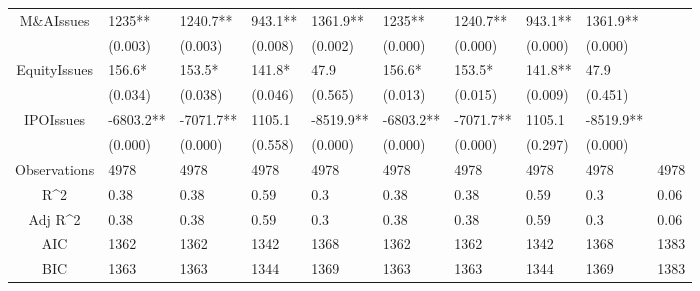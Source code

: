 \documentclass{article}
\begin{document}
\begin{table}[H]
\begin{tabular}{|clllllllll|}
  M\&AIssues & 1235** & 1240.7** & 943.1** & 1361.9** & 1235** & 1240.7** & 943.1** & 1361.9** &  \\ 
   & (0.003) & (0.003) & (0.008) & (0.002) & (0.000) & (0.000) & (0.000) & (0.000) &  \\ 
  EquityIssues & 156.6* & 153.5* & 141.8* & 47.9 & 156.6* & 153.5* & 141.8** & 47.9 &  \\ 
   & (0.034) & (0.038) & (0.046) & (0.565) & (0.013) & (0.015) & (0.009) & (0.451) &  \\ 
  IPOIssues & -6803.2** & -7071.7** & 1105.1 & -8519.9** & -6803.2** & -7071.7** & 1105.1 & -8519.9** &  \\ 
   & (0.000) & (0.000) & (0.558) & (0.000) & (0.000) & (0.000) & (0.297) & (0.000) &  \\ 
  \hline 
 Observations & 4978 & 4978 & 4978 & 4978 & 4978 & 4978 & 4978 & 4978 & 4978 \\ 
  R^2 & 0.38 & 0.38 & 0.59 & 0.3 & 0.38 & 0.38 & 0.59 & 0.3 & 0.06 \\ 
  Adj R^2 & 0.38 & 0.38 & 0.59 & 0.3 & 0.38 & 0.38 & 0.59 & 0.3 & 0.06 \\ 
  AIC & 1362 & 1362 & 1342 & 1368 & 1362 & 1362 & 1342 & 1368 & 1383 \\ 
  BIC & 1363 & 1363 & 1344 & 1369 & 1363 & 1363 & 1344 & 1369 & 1383 \\ 
   \hline
\end{tabular}
 
\end{table}
\end{document}
